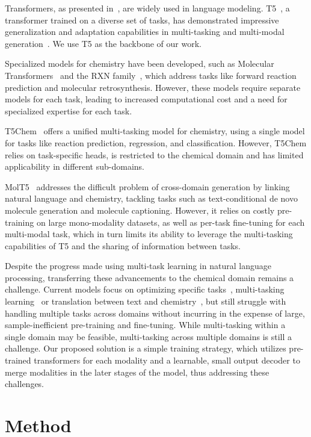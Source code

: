 \documentclass[nohyperref]{article}
\theoremstyle{plain}
\theoremstyle{definition}
\theoremstyle{remark}
\begin{document}
Transformers, as presented in~\citep{vaswani2017attention}, are widely used in language modeling. T5~\citep{raffel2020exploring}, a transformer trained on a diverse set of tasks, has demonstrated impressive generalization and adaptation capabilities in multi-tasking and multi-modal generation~\citep{saharia2022photorealistic}. We use T5 as the backbone of our work.

Specialized models for chemistry have been developed, such as Molecular Transformers~\citep{schwaller2019molecular} and the RXN family~\citep{schwaller2018found, schwaller2020predicting, toniato2021unassisted, vaucher2020automated}, which address tasks like forward reaction prediction and molecular retrosynthesis. However, these models require separate models for each task, leading to increased computational cost and a need for specialized expertise for each task.

T5Chem~\citep{lu2022unified} offers a unified multi-tasking model for chemistry, using a single model for tasks like reaction prediction, regression, and classification. However, T5Chem relies on task-specific heads, is restricted to the chemical domain and has limited applicability in different sub-domains.


MolT5~\citep{edwards2022translation} addresses the difficult problem of cross-domain generation by linking natural language and chemistry, tackling tasks such as text-conditional de novo molecule generation and molecule captioning. However, it relies on costly pre-training on large mono-modality datasets, as well as per-task fine-tuning for each multi-modal task, which in turn limits its ability to leverage the multi-tasking capabilities of T5 and the sharing of information between tasks.

Despite the progress made using multi-task learning in natural language processing, transferring these advancements to the chemical domain remains a challenge. Current models focus on optimizing specific tasks~\citep{schwaller2019molecular}, multi-tasking learning~\citep{lu2022unified} or translation between text and chemistry~\citep{edwards2022translation}, but still struggle with handling multiple tasks across domains without incurring in the expense of large, sample-inefficient pre-training and fine-tuning. 
While multi-tasking within a single domain may be feasible, multi-tasking across multiple domains is still a challenge. Our proposed solution is a simple training strategy, which utilizes pre-trained transformers for each modality and a learnable, small output decoder to merge modalities in the later stages of the model, thus addressing these challenges. \section{Method}
\label{section:method}
\end{document}
